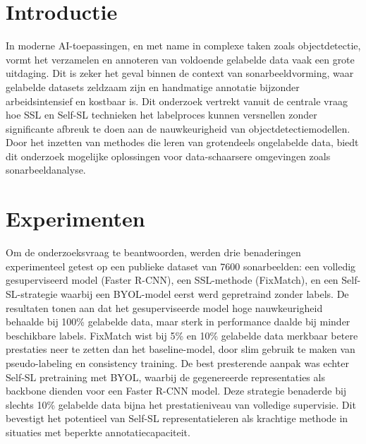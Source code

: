 \documentclass[a0,portrait]{hogent-poster}
\begin{document}
\begin{multicols}{2} %

\section{Introductie}

In moderne AI-toepassingen, en met name in complexe taken zoals objectdetectie, vormt het verzamelen en annoteren van voldoende gelabelde data vaak een grote uitdaging. Dit is zeker het geval binnen de context van sonarbeeldvorming, waar gelabelde datasets zeldzaam zijn en handmatige annotatie bijzonder arbeidsintensief en kostbaar is. Dit onderzoek vertrekt vanuit de centrale vraag hoe SSL en Self-SL technieken het labelproces kunnen versnellen zonder significante afbreuk te doen aan de nauwkeurigheid van objectdetectiemodellen. Door het inzetten van methodes die leren van grotendeels ongelabelde data, biedt dit onderzoek mogelijke oplossingen voor data-schaarsere omgevingen zoals sonarbeeldanalyse.

\section{Experimenten}

Om de onderzoeksvraag te beantwoorden, werden drie benaderingen experimenteel getest op een publieke dataset van 7600 sonarbeelden: een volledig gesuperviseerd model (Faster R-CNN), een SSL-methode (FixMatch), en een Self-SL-strategie waarbij een BYOL-model eerst werd gepretraind zonder labels. De resultaten tonen aan dat het gesuperviseerde model hoge nauwkeurigheid behaalde bij 100\% gelabelde data, maar sterk in performance daalde bij minder beschikbare labels. FixMatch wist bij 5\% en 10\% gelabelde data merkbaar betere prestaties neer te zetten dan het baseline-model, door slim gebruik te maken van pseudo-labeling en consistency training. De best presterende aanpak was echter Self-SL pretraining met BYOL, waarbij de gegenereerde representaties als backbone dienden voor een Faster R-CNN model. Deze strategie benaderde bij slechts 10\% gelabelde data bijna het prestatieniveau van volledige supervisie. Dit bevestigt het potentieel van Self-SL representatieleren als krachtige methode in situaties met beperkte annotatiecapaciteit.


\end{multicols}
\end{document}
